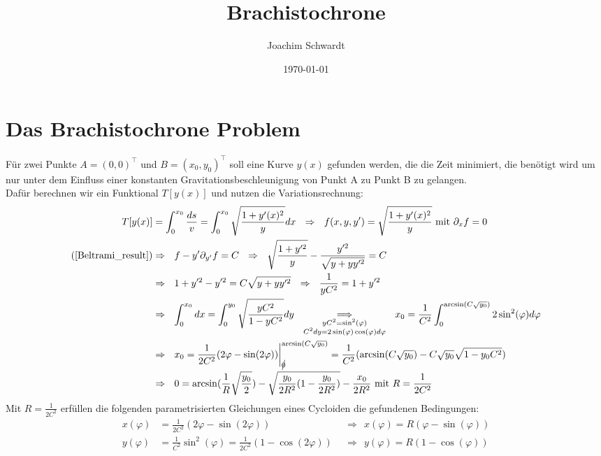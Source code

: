 \documentclass[a4paper,12pt]{article}
\begin{document}
\title{Brachistochrone}
\author{Joachim Schwardt}
\date{\today}
\maketitle

\section*{Das Brachistochrone Problem}
Für zwei Punkte $A = (0, 0)^\top$ und $B = (x_0, y_0)^\top$ soll eine Kurve $y(x)$ gefunden werden, die die Zeit minimiert, die benötigt wird um nur unter dem Einfluss einer konstanten Gravitationsbeschleunigung von Punkt A zu Punkt B zu gelangen.\\
Dafür berechnen wir ein Funktional $T[y(x)]$ und nutzen die Variationsrechnung:
\begin{align*}
T[y(x)]&=\int_{0}^{x_0}\frac{ds}{v}=\int_{0}^{x_0} \sqrt{\frac{1+y'(x)^2}{y}}dx\ \ \Rightarrow\ \ f(x, y, y')=\sqrt{\frac{1+y'(x)^2}{y}}\ \textrm{mit }\partial_xf=0\\
(\ref{Beltrami_result})&\Rightarrow\ \ f-y'\partial_{y'}f=C\ \ \Rightarrow\ \ \sqrt{\frac{1+y'^2}{y}}-\frac{y'^2}{\sqrt{y+yy'^2}}=C\\
&\Rightarrow\ \ 1+y'^2-y'^2=C\sqrt{y+yy'^2}\ \ \Rightarrow\ \ \frac{1}{yC^2}=1+y'^2\\ 
&\Rightarrow\ \ \int_{0}^{x_0}dx=\int_{0}^{y_0}\sqrt{\frac{yC^2}{1-yC^2}}dy\ \ \underset{\substack{yC^2=\sin^2(\varphi)\\ C^2dy=2\sin(\varphi)\cos(\varphi)d\varphi}}{\Longrightarrow}\ \ x_0=\frac{1}{C^2}\int_{0}^{\arcsin(C\sqrt{y_0})}2\sin^2(\varphi)d\varphi\\
&\Rightarrow\ \ x_0=\frac{1}{2C^2}(2\varphi - \sin(2\varphi))\bigg\vert_{\cancel 0}^{\arcsin(C\sqrt{y_0})}=\frac{1}{C^2}(\arcsin(C\sqrt{y_0})-C\sqrt{y_0}\sqrt{1-y_0C^2})\\
&\Rightarrow\ \ 0=\arcsin(\frac{1}{R}\sqrt{\frac{y_0}{2}})-\sqrt{\frac{y_0}{2R^2}(1-\frac{y_0}{2R^2})}-\frac{x_0}{2R^2}\ \textrm{mit }R=\frac{1}{2C^2}
\end{align*}
Mit $R=\frac{1}{2C^2}$ erfüllen die folgenden parametrisierten Gleichungen eines Cycloiden die gefundenen Bedingungen:
\begin{align*}
x(\varphi)&=\frac{1}{2C^2}(2\varphi - \sin(2\varphi))\ \ &\Rightarrow\ \ x(\varphi) = R(\varphi-\sin(\varphi)) \\
y(\varphi)&=\frac{1}{C^2}\sin^2(\varphi)=\frac{1}{2C^2}(1-\cos(2\varphi))\ \ &\Rightarrow\ \ y(\varphi)=R(1-\cos(\varphi))
\end{align*}
\end{document}
